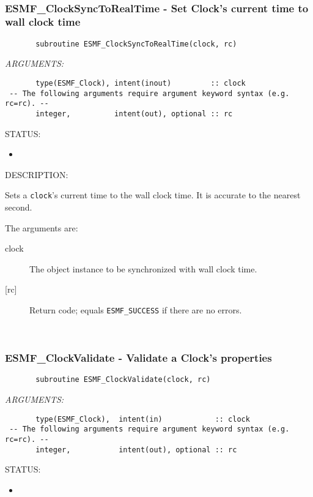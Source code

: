 \mbox{}\hrulefill\ 
 
\subsubsection [ESMF\_ClockSyncToRealTime] {ESMF\_ClockSyncToRealTime - Set Clock's current time to wall clock time}


 
\begin{verbatim}       subroutine ESMF_ClockSyncToRealTime(clock, rc)
 \end{verbatim}{\em ARGUMENTS:}
\begin{verbatim}       type(ESMF_Clock), intent(inout)         :: clock
 -- The following arguments require argument keyword syntax (e.g. rc=rc). --
       integer,          intent(out), optional :: rc
 \end{verbatim}
{\sf STATUS:}
   \begin{itemize}
   \item{}
   \end{itemize}
  
{\sf DESCRIPTION:\\ }


       Sets a {\tt clock}'s current time to the wall clock time.  It is
       accurate to the nearest second.
  
       The arguments are:
       \begin{description}
       \item[clock]
            The object instance to be synchronized with wall clock time.
       \item[{[rc]}]
            Return code; equals {\tt ESMF\_SUCCESS} if there are no errors.
       \end{description}
   
 
\mbox{}\hrulefill\ 
 
\subsubsection [ESMF\_ClockValidate] {ESMF\_ClockValidate - Validate a Clock's properties}


 
\begin{verbatim}       subroutine ESMF_ClockValidate(clock, rc)
 \end{verbatim}{\em ARGUMENTS:}
\begin{verbatim}       type(ESMF_Clock),  intent(in)            :: clock
 -- The following arguments require argument keyword syntax (e.g. rc=rc). --
       integer,           intent(out), optional :: rc
 \end{verbatim}
{\sf STATUS:}
   \begin{itemize}
   \item{}
   \end{itemize}
  
